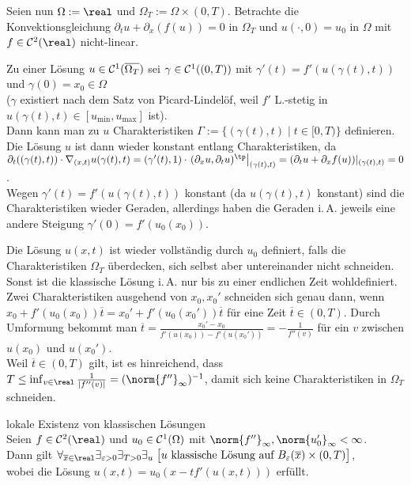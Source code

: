 \begin{Bem}
    Seien nun $\Omega := \real$ und $\Omega_T := \Omega \times (0, T)$.
    Betrachte die Konvektionsgleichung
    $\partial_t u + \partial_x(f(u)) = 0$ in $\Omega_T$ und
    $u(\cdot, 0) = u_0$ in $\Omega$
    mit $f \in \C^2(\real)$ nicht-linear.
    
    Zu einer Lösung $u \in \mathcal{C}^1(\overline{\Omega_T})$ sei
    $\gamma \in \mathcal{C}^1((0, T))$ mit $\gamma'(t) = f'(u(\gamma(t), t))$ und
    $\gamma(0) = x_0 \in \Omega$\\
    ($\gamma$ existiert nach dem Satz von Picard-Lindelöf, weil $f'$ L.-stetig in
    $u(\gamma(t), t) \in [u_\text{min}, u_\text{max}]$ ist).\\
    Dann kann man zu $u$ Charakteristiken $\Gamma := \{(\gamma(t), t) \;|\; t \in [0, T)\}$
    definieren.\\
    Die Lösung $u$ ist dann wieder konstant entlang Charakteristiken, da\\
    $\partial_t((\gamma(t), t)) \cdot \nabla_{(x,t)} u(\gamma(t), t)
    = (\gamma'(t), 1) \cdot \left.(\partial_x u, \partial_t u)^\tp\right|_{(\gamma(t), t)}
    = (\partial_t u + \partial_x f(u))|_{(\gamma(t), t)} = 0$.\\
    Wegen $\gamma'(t) = f'(u(\gamma(t), t))$ konstant (da $u(\gamma(t), t)$ konstant)
    sind die Charakteristiken wieder Geraden, allerdings
    haben die Geraden i.\,A. jeweils eine andere Steigung $\gamma'(0) = f'(u_0(x_0))$.
    
    Die Lösung $u(x, t)$ ist wieder vollständig durch $u_0$ definiert, falls die Charakteristiken
    $\Omega_T$ überdecken, sich selbst aber untereinander nicht schneiden.
    Sonst ist die klassische Lösung i.\,A. nur bis zu einer endlichen Zeit wohldefiniert.
    Zwei Charakteristiken ausgehend von $x_0, x_0'$ schneiden sich genau dann, wenn
    $x_0 + f'(u_0(x_0)) \overline{t} = x_0' + f'(u_0(x_0')) \overline{t}$
    für eine Zeit $\overline{t} \in (0, T)$.
    Durch Umformung bekommt man
    $\overline{t} = \frac{x_0' - x_0}{f'(u(x_0)) - f'(u(x_0'))} = -\frac{1}{f''(v)}$
    für ein $v$ zwischen $u(x_0)$ und $u(x_0')$.\\
    Weil $\overline{t} \in (0, T)$ gilt, ist es hinreichend, dass
    $T \le \inf_{v \in \real} \frac{1}{|f''(v)|} = (\norm{f''}_\infty)^{-1}$,
    damit sich keine Charakteristiken in $\Omega_T$ schneiden.
\end{Bem}

\linie

\begin{Satz}{lokale Existenz von klassischen Lösungen}\\
    Seien $f \in \C^2(\real)$ und $u_0 \in \mathcal{C}^1(\Omega)$ mit
    $\norm{f''}_\infty, \norm{u_0'}_\infty < \infty$.\\
    Dann gilt $\forall_{\overline{x} \in \real} \exists_{\varepsilon > 0} \exists_{T > 0}
    \exists_{u}\;
    \big[\text{$u$ klassische Lösung auf $B_\varepsilon(\overline{x}) \times (0, T)$}\big]$,\\
    wobei die Lösung $u(x, t) = u_0(x - tf'(u(x, t)))$ erfüllt.
\end{Satz}

